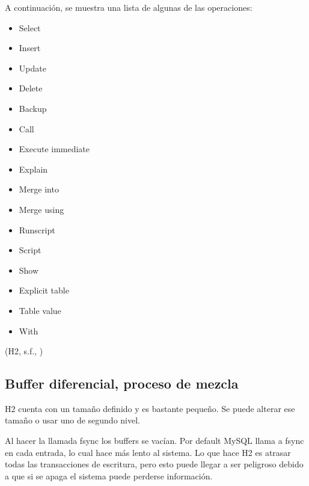 \documentclass{acmart}
\begin{document}
A continuación, se muestra una lista de algunas de las operaciones:


\begin{itemize}

\item Select

\item Insert

\item Update

\item Delete

\item Backup

\item Call

\item Execute immediate

\item Explain

\item Merge into

\item Merge using

\item Runscript

\item Script

\item Show

\item Explicit table

\item Table value

\item With



\end{itemize}

(H2, s.f., \cite{h2commands})

\subsection{Buffer diferencial, proceso de mezcla}

H2 cuenta con un tamaño definido y es bastante pequeño. Se puede alterar ese tamaño o usar uno de segundo nivel.  



Al hacer la llamada fsync los buffers se vacían. Por default MySQL llama a fsync en cada entrada, lo cual hace más lento al sistema. Lo que hace H2 es atrasar todas las transacciones de escritura, pero esto puede llegar a ser peligroso debido a que si se apaga el sistema puede perderse información. 
\end{document}
